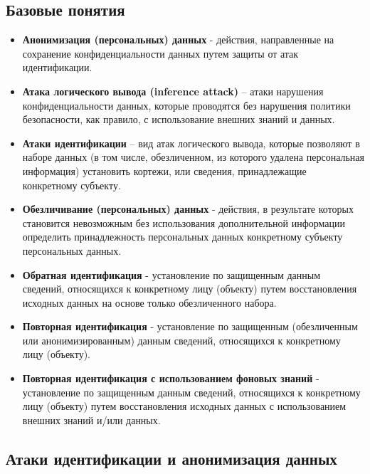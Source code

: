 \documentclass[areasetadvanced]{scrartcl}
\begin{document}
\subsection{Базовые понятия}
\begin{itemize}
    \item \textbf{Анонимизация (персональных) данных} - действия, направленные на сохранение конфиденциальности данных путем защиты от атак идентификации.
    
    \item \textbf{Атака логического вывода (inference attack)} – атаки нарушения конфиденциальности данных, которые проводятся без нарушения политики безопасности, как правило, с использование внешних знаний и данных.
    
    \item \textbf{Атаки идентификации} – вид атак логического вывода, которые позволяют в наборе данных (в том числе, обезличенном, из которого удалена персональная информация) установить кортежи, или сведения, принадлежащие конкретному субъекту.
    
    \item \textbf{Обезличивание (персональных) данных} - действия, в результате которых становится невозможным без использования дополнительной информации определить принадлежность персональных данных конкретному субъекту персональных данных.
    
    \item \textbf{Обратная идентификация} - установление по защищенным данным сведений, относящихся к конкретному лицу (объекту) путем восстановления исходных данных на основе только обезличенного набора.
    
    \item \textbf{Повторная идентификация} - установление по защищенным (обезличенным или анонимизированным) данным сведений, относящихся к конкретному лицу (объекту).
    
    \item \textbf{Повторная идентификация с использованием фоновых знаний} - установление по защищенным данным сведений, относящихся к конкретному лицу (объекту) путем восстановления исходных данных с использованием внешних знаний и/или данных.
\end{itemize}

\subsection{Атаки идентификации и анонимизация данных}
\end{document}
